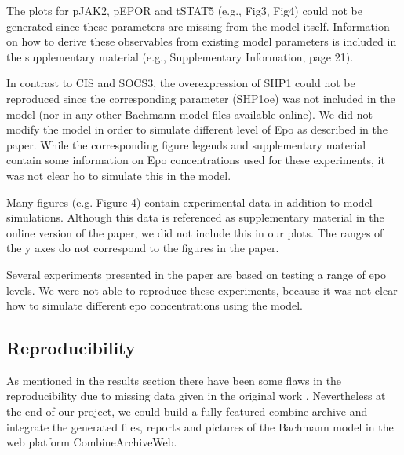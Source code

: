 The plots for pJAK2, pEPOR and tSTAT5 (e.g., Fig3, Fig4) could not be generated since these parameters are missing from the model itself. Information on how to derive these observables from existing model parameters is included in the supplementary material (e.g., Supplementary Information, page 21). 

In contrast to CIS and SOCS3, the overexpression of SHP1 could not be reproduced since the corresponding parameter (SHP1oe) was not included in the model (nor in any other Bachmann model files available online). We did not modify the model in order to simulate different level of Epo as described in the paper. While the corresponding figure legends and supplementary material contain some information on Epo concentrations used for these experiments, it was not clear ho to simulate this in the model.

Many figures (e.g. Figure 4) contain experimental data in addition to model simulations. Although this data is referenced as supplementary material in the online version of the paper, we did not include this in our plots. The ranges of the y axes do not correspond to the figures in the paper. 

Several experiments presented in the paper are based on testing a range of \ac{epo} levels. We were not able to reproduce these experiments, because it was not clear how to simulate different \ac{epo} concentrations using the model.

\subsection*{Reproducibility}
As mentioned in the results section there have been some flaws in the reproducibility due to missing data given in the original work \cite{bachmannmodel}. Nevertheless at the end of our project, we could build a fully-featured \ac{combine} archive and integrate the generated files, reports and pictures of the Bachmann model in the web platform CombineArchiveWeb.